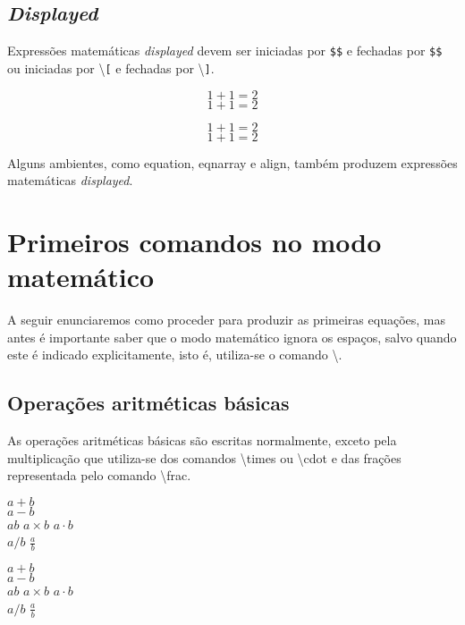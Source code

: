 \subsection{\textit{Displayed}}
Expressões matemáticas \textit{displayed} devem ser iniciadas por \texttt{\$\$} e fechadas por \texttt{\$\$} ou iniciadas por \textbackslash\texttt{[} e fechadas por \textbackslash\texttt{]}. \\
\begin{minipage}[t]{0.47\linewidth} \vspace{-8pt}
    \begin{latexcode}
        $$1 + 1 = 2$$
        \[1 + 1 = 2\]
    \end{latexcode}
\end{minipage} \hfill
\begin{minipage}[t]{0.47\linewidth} \vspace{0pt}
    $$1 + 1 = 2$$
    \[1 + 1 = 2\]
\end{minipage}

Alguns ambientes, como \textsf{equation}, \textsf{eqnarray} e \textsf{align}, também produzem expressões matemáticas \textit{displayed}.

\section{Primeiros comandos no modo matemático}

A seguir enunciaremos como proceder para produzir as primeiras equações, mas antes é importante saber que o modo matemático ignora os espaços, salvo quando este é indicado explicitamente, isto é, utiliza-se o comando \textbackslash.

\subsection{Operações aritméticas básicas}
As operações aritméticas básicas são escritas normalmente, exceto pela multiplicação que utiliza-se dos comandos \textbackslash\textsf{times} ou \textbackslash\textsf{cdot} e das frações representada pelo comando \textbackslash\textsf{frac}. \\
\begin{minipage}[t]{0.47\linewidth} \vspace{-8pt}
    \begin{latexcode}
        $a + b$ \\
        $a - b$ \\
        $a b$  $a \times b$   $a \cdot b$ \\
        $a / b$  $\frac{a}{b}$
    \end{latexcode}
\end{minipage} \hfill
\begin{minipage}[t]{0.47\linewidth} \vspace{0pt}
    $a + b$ \\
    $a - b$ \\
    $a b$  $a \times b$   $a \cdot b$ \\
    $a / b$  $\frac{a}{b}$
\end{minipage}

